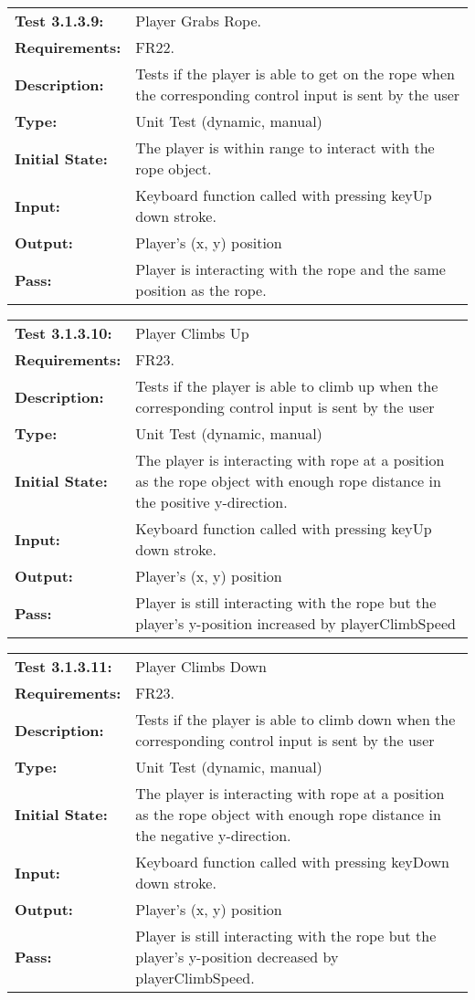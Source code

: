 \documentclass[12pt, titlepage]{article}
\begin{document}
\begin{tabular}{|l|p{10cm}|}
    \hline
    \bf{Test} 3.1.3.9: & Player Grabs Rope.\\
    \bf{Requirements}: & FR22.\\
    \bf{Description}: & Tests if the player is able to get on the rope when the corresponding control input is sent by the user \\
    \bf{Type}: & Unit Test (dynamic, manual) \\
    \bf{Initial State}: & The player is within range to interact with the rope object.\\
    \bf{Input}: & Keyboard function called with pressing keyUp down stroke. \\
    \bf{Output}: & Player's (x, y) position\\
    \bf{Pass}: & Player is interacting with the rope and the same position as the rope.\\
    \hline
\end{tabular}

\begin{tabular}{|l|p{10cm}|}
    \hline
    \bf{Test} 3.1.3.10: & Player Climbs Up\\
    \bf{Requirements}: & FR23.\\
    \bf{Description}: & Tests if the player is able to climb up when the corresponding control input is sent by the user \\
    \bf{Type}: & Unit Test (dynamic, manual) \\
    \bf{Initial State}: & The player is interacting with rope at a position as the rope object with enough rope distance in the positive y-direction.\\
    \bf{Input}: & Keyboard function called with pressing keyUp down stroke. \\
    \bf{Output}: & Player's (x, y) position\\
    \bf{Pass}: & Player is still interacting with the rope but the player's y-position increased by playerClimbSpeed\\
    \hline
\end{tabular}

\begin{tabular}{|l|p{10cm}|}
    \hline
    \bf{Test} 3.1.3.11: & Player Climbs Down\\
    \bf{Requirements}: & FR23.\\
    \bf{Description}: & Tests if the player is able to climb down when the corresponding control input is sent by the user \\
    \bf{Type}: & Unit Test (dynamic, manual) \\
    \bf{Initial State}: & The player is interacting with rope at a position as the rope object with enough rope distance in the negative y-direction.\\
    \bf{Input}: & Keyboard function called with pressing keyDown down stroke. \\
    \bf{Output}: & Player's (x, y) position\\
    \bf{Pass}: & Player is still interacting with the rope but the player's y-position decreased by playerClimbSpeed.\\
    \hline
\end{tabular}
\end{document}
